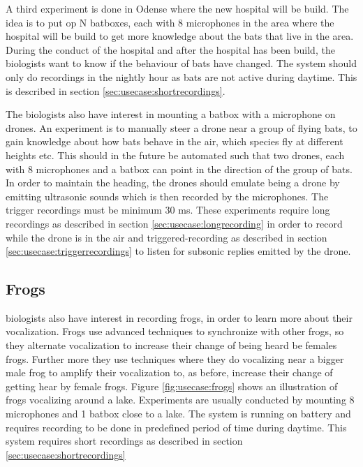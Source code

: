 A third experiment is done in Odense where the new hospital will be build.
The idea is to put op N batboxes, each with 8 microphones in the area where the hospital will be build to get more knowledge about the bats that live in the area. During the conduct of the hospital and after the hospital has been build, the biologists want to know if the behaviour of bats have changed. The system should only do recordings in the nightly hour as bats are not active during daytime. This is described in section \ref{sec:usecase:shortrecordings}.

The biologists also have interest in mounting a batbox with a microphone on drones. An experiment is to manually steer a drone near a group of flying bats, to gain knowledge about how bats behave in the air, which species fly at different heights etc. This should in the future be automated such that two drones, each with 8 microphones and a batbox can point in the direction of the group of bats. In order to maintain the heading, the drones should emulate being a drone by emitting ultrasonic sounds which is then recorded by the microphones. The trigger recordings must be minimum 30 ms.
These experiments require long recordings as described in section \ref{sec:usecase:longrecording} in order to record while the drone is in the air and triggered-recording as described in section \ref{sec:usecase:triggerrecordings} to listen for subsonic replies emitted by the drone.

\subsection{Frogs}
biologists also have interest in recording frogs, in order to learn more about their vocalization. Frogs use advanced techniques to synchronize with other frogs, so they alternate vocalization to increase their change of being heard be females frogs. Further more they use techniques where they do vocalizing near a bigger male frog to amplify their vocalization to, as before, increase their change of getting hear by female frogs. Figure \ref{fig:usecase:frogs} shows an illustration of frogs vocalizing around a lake. Experiments are usually conducted by mounting 8 microphones and 1 batbox close to a lake. The system is running on battery and requires recording to be done in predefined period of time during daytime. This system requires short recordings as described in section \ref{sec:usecase:shortrecordings}

